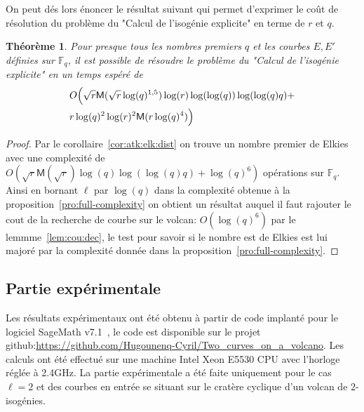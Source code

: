 \documentclass[10pt,a4paper]{book}
\theoremstyle{plain}
\newtheorem{thm}{Théorème}[chapter]
\theoremstyle{definition}
\theoremstyle{definition}
\theoremstyle{definition}
\theoremstyle{definition}
\theoremstyle{remark}
\theoremstyle{remark}
\theoremstyle{definition}
\begin{document}
On peut dés lors énoncer le résultat suivant qui permet d'exprimer le coût de 
résolution du problème du "Calcul de l'isogénie explicite" en terme de $r$ et $q$.

\begin{thm}
\label{thm:gen:elk:fin}
Pour presque tous les nombres premiers $q$ et les courbes $E,E'$ définies sur 
$\mathbb{F}_q$, il est possible de résoudre le problème du "Calcul de l'isogénie explicite" 
en un temps espéré de 
 \begin{equation*}
 \begin{alignedat}{1}
& O\Bigl(\sqrt{r}\mathsf{M}(\sqrt{r}\log(q)^{1,5})\log(r)\log(\log(q))\log(\log(q) q) + \\
& r \log(q)^2\log(r)^2 \mathsf{M}(r \log(q)^4) \Bigr)
\end{alignedat}
 \end{equation*}
\end{thm}

\begin{proof}
Par le corollaire~\ref{cor:atk:elk:dist} on trouve un nombre premier de Elkies 
avec une complexité de $O(\sqrt{r}\mathsf{M}(\sqrt{r})\log(q)\log(\log(q) q)+\log(q)^6)$ 
opérations sur $\mathbb{F}_q$.
Ainsi en bornant $\ell$ par $\log(q)$ dans la complexité obtenue à la 
proposition~\ref{pro:full-complexity} on obtient un résultat auquel il faut 
rajouter le cout de la recherche de courbe sur le volcan: $O(\log(q)^6)$ par le 
lemmme~\ref{lem:cou:dec}, le test pour savoir si le nombre est de Elkies 
est lui majoré par la complexité donnée dans la 
proposition~\ref{pro:full-complexity}.
\end{proof}

\subsection{Partie expérimentale}
\label{ssec:exp:cou}

Les résultats expérimentaux ont été obtenu à partir de code implanté pour le 
logiciel SageMath v7.1~\cite{Sage}, le code est disponible sur le projet 
github:\url{https://github.com/Hugounenq-Cyril/Two_curves_on_a_volcano}. Les 
calculs ont été effectué sur une machine Intel Xeon E5530 CPU avec l'horloge 
réglée à 2.4GHz. La partie expérimentale a été faite uniquement pour le cas 
$\ell=2$ et des courbes en entrée se situant sur le cratère cyclique d'un 
volcan de $2$-isogénies.
\end{document}
